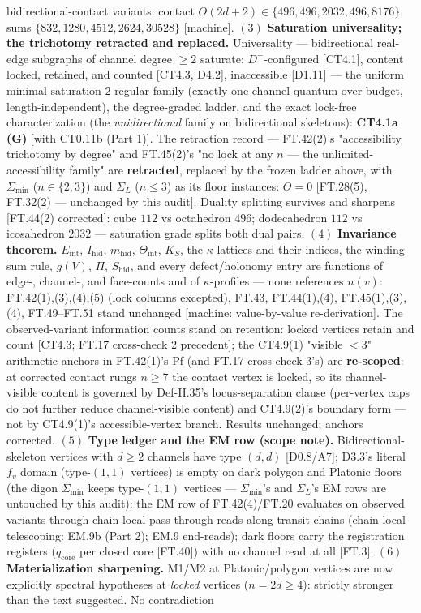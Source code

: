 \begin{theorem}
bidirectional-contact variants: contact $O(2d{+}2)\in\{496,496,2032,496,8176\}$, sums $\{832,1280,4512,2624,30528\}$ [machine]. $(3)$ \textbf{Saturation universality; the trichotomy retracted and replaced.} Universality — bidirectional real-edge subgraphs of channel degree $\ge2$ saturate: $D^-$-configured [CT4.1], content locked, retained, and counted [CT4.3, D4.2], inaccessible [D1.11] — the uniform minimal-saturation $2$-regular family (exactly one channel quantum over budget, length-independent), the degree-graded ladder, and the exact lock-free characterization (the \textit{unidirectional} family on bidirectional skeletons): \textbf{CT4.1a (G)} [with CT0.11b (Part 1)]. The retraction record — FT.42(2)'s "accessibility trichotomy by degree" and FT.45(2)'s "no lock at any $n$ — the unlimited-accessibility family" are \textbf{retracted}, replaced by the frozen ladder above, with $\Sigma_{\min}$ ($n\in\{2,3\}$) and $\Sigma_L$ ($n\le3$) as its floor instances: $O=0$ [FT.28(5), FT.32(2) — unchanged by this audit]. Duality splitting survives and sharpens [FT.44(2) corrected]: cube $112$ vs octahedron $496$; dodecahedron $112$ vs icosahedron $2032$ — saturation grade splits both dual pairs. $(4)$ \textbf{Invariance theorem.} $E_{\mathrm{int}}$, $I_{\mathrm{hid}}$, $m_{\mathrm{hid}}$, $\Theta_{\mathrm{int}}$, $K_S$, the $\kappa$-lattices and their indices, the winding sum rule, $g(V)$, $\Pi$, $S_{\mathrm{hid}}$, and every defect/holonomy entry are functions of edge-, channel-, and face-counts and of $\kappa$-profiles — none references $n(v)$: FT.42(1),(3),(4),(5) (lock columns excepted), FT.43, FT.44(1),(4), FT.45(1),(3),(4), FT.49–FT.51 stand unchanged [machine: value-by-value re-derivation]. The observed-variant information counts stand on retention: locked vertices retain and count [CT4.3; FT.17 cross-check 2 precedent]; the CT4.9(1) "visible $<3$" arithmetic anchors in FT.42(1)'s Pf (and FT.17 cross-check 3's) are \textbf{re-scoped}: at corrected contact rungs $n\ge7$ the contact vertex is locked, so its channel-visible content is governed by Def-H.35's locus-separation clause (per-vertex caps do not further reduce channel-visible content) and CT4.9(2)'s boundary form — not by CT4.9(1)'s accessible-vertex branch. Results unchanged; anchors corrected. $(5)$ \textbf{Type ledger and the EM row (scope note).} Bidirectional-skeleton vertices with $d\ge2$ channels have type $(d,d)$ [D0.8/A7]; D3.3's literal $f_v$ domain (type-$(1,1)$ vertices) is empty on dark polygon and Platonic floors (the digon $\Sigma_{\min}$ keeps type-$(1,1)$ vertices — $\Sigma_{\min}$'s and $\Sigma_L$'s EM rows are untouched by this audit): the EM row of FT.42(4)/FT.20 evaluates on observed variants through chain-local pass-through reads along transit chains (chain-local telescoping: EM.9b (Part 2); EM.9 end-reads); dark floors carry the registration registers ($q_{\mathrm{core}}$ per closed core [FT.40]) with no channel read at all [FT.3]. $(6)$ \textbf{Materialization sharpening.} M1/M2 at Platonic/polygon vertices are now explicitly spectral hypotheses at \textit{locked} vertices ($n=2d\ge4$): strictly stronger than the text suggested. No contradiction 
\end{theorem}

